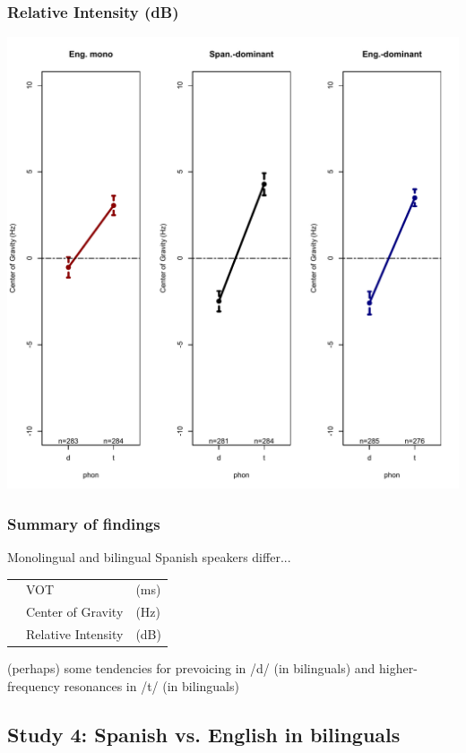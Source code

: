 \documentclass{beamer}
\newcommand{\xmark}{\ding{55}}%
\begin{document}
\begin{frame}
\frametitle{Relative Intensity (dB)}
\begin{center}
\includegraphics[scale=.375]{simplified/fig09_rienglish.pdf}
\end{center}
\end{frame}

\begin{frame}
\frametitle{Summary of findings}
Monolingual and bilingual Spanish speakers differ...
\begin{center}
\begin{tabular}{l l l}
\xmark & VOT & (ms) \\
\xmark & Center of Gravity & (Hz) \\
\xmark & Relative Intensity & (dB) \\
\end{tabular}
\end{center}
(perhaps) some tendencies for prevoicing in /d/ (in bilinguals) and higher-frequency resonances in /t/ (in bilinguals)
\end{frame}

\subsection{Study 4: Spanish vs. English  in bilinguals}
\end{document}
